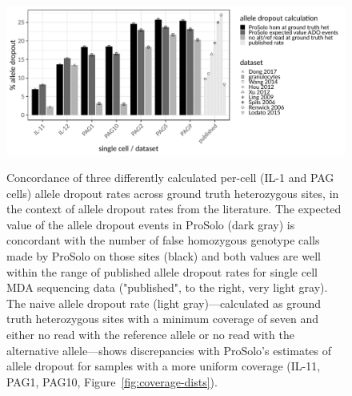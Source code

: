 \documentclass[fleqn,12pt,inline]{wlscirep}
\begin{document}
\begin{figure}[!tpb]
  \includegraphics[width=\linewidth]{figs/prosolo_ado-rate_expected-vs-ground-truth.pdf} \\
  \caption{
    Concordance of three differently calculated per-cell (IL-1 and PAG cells) allele dropout rates across ground truth heterozygous sites, in the context of allele dropout rates from the literature\cite{wang_clonal_2014,hou_single-cell_2012,xu_single-cell_2012,ling_evaluation_2009,spits_whole-genome_2006,spits_optimization_2006,renwick_proof_2006,lodato_somatic_2015}.
    The expected value of the allele dropout events in ProSolo (dark gray) is concordant with the number of false homozygous genotype calls made by ProSolo on those sites (black) and both values are well within the range of published allele dropout rates for single cell MDA sequencing data ("published", to the right, very light gray).
    The naive allele dropout rate (light gray)---calculated as ground truth heterozygous sites with a minimum coverage of seven and either no read with the reference allele or no read with the alternative allele---shows discrepancies with ProSolo's estimates of allele dropout for samples with a more uniform coverage (IL-11, PAG1, PAG10, Figure~\ref{fig:coverage-dists}).
  }
  \label{fig:allele-dropout}
\end{figure}
\end{document}
